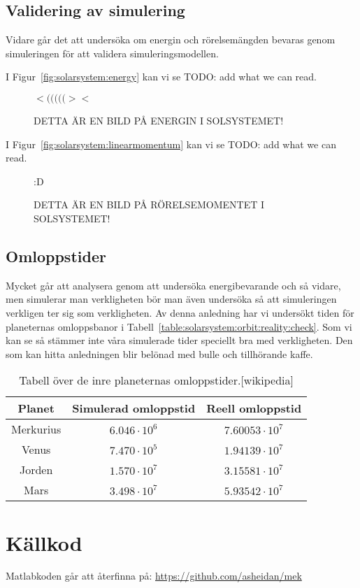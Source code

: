 \documentclass[a4]{article}
\begin{document}

		\subsection{Validering av simulering}
Vidare går det att undersöka om energin och rörelsemängden
bevaras genom simuleringen för att validera
simuleringsmodellen.

I Figur~\vref{fig:solarsystem:energy} kan vi se TODO: add what we can read.
\begin{figure}
\begin{center}
$<(((((><$
\end{center}
\caption{DETTA ÄR EN BILD PÅ ENERGIN I SOLSYSTEMET!}
\label{fig:solarsystem:energy}
\end{figure}

I Figur~\vref{fig:solarsystem:linearmomentum} kan vi se TODO: add what we can read.
\begin{figure}
\begin{center}
:D
\end{center}
\caption{DETTA ÄR EN BILD PÅ RÖRELSEMOMENTET I SOLSYSTEMET!}
\label{fig:solarsystem:linearmomentum}
\end{figure}


		\subsection{Omloppstider}
Mycket går att analysera genom att undersöka energibevarande och så vidare, men
simulerar man verkligheten bör man även undersöka så att simuleringen verkligen
ter sig som verkligheten.
Av denna anledning har vi undersökt tiden för planeternas omloppsbanor i
Tabell~\vref{table:solarsystem:orbit:reality:check}.
Som vi kan se så stämmer inte våra simulerade tider speciellt bra med
verkligheten.
Den som kan hitta anledningen blir belönad med bulle och tillhörande kaffe.

\begin{table}
\begin{center}
\begin{tabular}{c|c|c}
	Planet    & Simulerad omloppstid & Reell omloppstid \\
	\hline
	Merkurius & $6.046 \cdot 10^6$ &  $7.60053 \cdot 10^7$ \\
	Venus     & $7.470 \cdot 10^5$ &  $1.94139 \cdot 10^7$ \\ 
	Jorden    & $1.570 \cdot 10^7$ &  $3.15581 \cdot 10^7$ \\
	Mars      & $3.498 \cdot 10^7$ &  $5.93542 \cdot 10^7$
\end{tabular}
\caption{
	Tabell över de inre planeternas omloppstider.[wikipedia]
}
\label{table:solarsystem:orbit:reality:check}
\end{center}
\end{table}

\section{Källkod}
	Matlabkoden går att återfinna på: \url{https://github.com/asheidan/mek}
	
\end{document}
